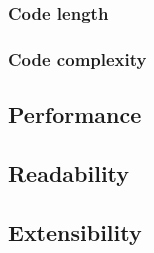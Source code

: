 \subsubsection{Code length}

\subsubsection{Code complexity}

\subsection{Performance}

\subsection{Readability}

\subsection{Extensibility}